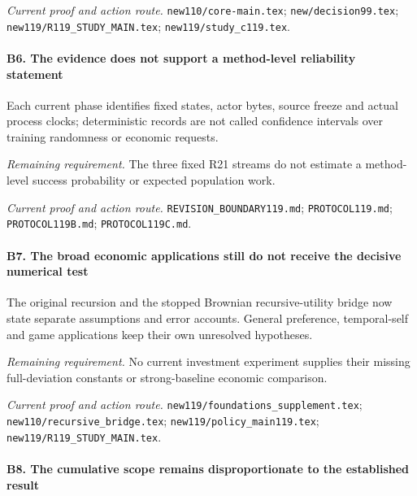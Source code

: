 \par\emph{Current proof and action route.} \nolinkurl{new110/core-main.tex}; \nolinkurl{new/decision99.tex}; \nolinkurl{new119/R119_STUDY_MAIN.tex}; \nolinkurl{new119/study_c119.tex}.

\paragraph{B6. The evidence does not support a method-level reliability statement}

Each current phase identifies fixed states, actor bytes, source freeze and actual process clocks; deterministic records are not called confidence intervals over training randomness or economic requests.

\par\emph{Remaining requirement.} The three fixed R21 streams do not estimate a method-level success probability or expected population work.

\par\emph{Current proof and action route.} \nolinkurl{REVISION_BOUNDARY119.md}; \nolinkurl{PROTOCOL119.md}; \nolinkurl{PROTOCOL119B.md}; \nolinkurl{PROTOCOL119C.md}.

\paragraph{B7. The broad economic applications still do not receive the decisive numerical test}

The original recursion and the stopped Brownian recursive-utility bridge now state separate assumptions and error accounts. General preference, temporal-self and game applications keep their own unresolved hypotheses.

\par\emph{Remaining requirement.} No current investment experiment supplies their missing full-deviation constants or strong-baseline economic comparison.

\par\emph{Current proof and action route.} \nolinkurl{new119/foundations_supplement.tex}; \nolinkurl{new110/recursive_bridge.tex}; \nolinkurl{new119/policy_main119.tex}; \nolinkurl{new119/R119_STUDY_MAIN.tex}.

\paragraph{B8. The cumulative scope remains disproportionate to the established result}

